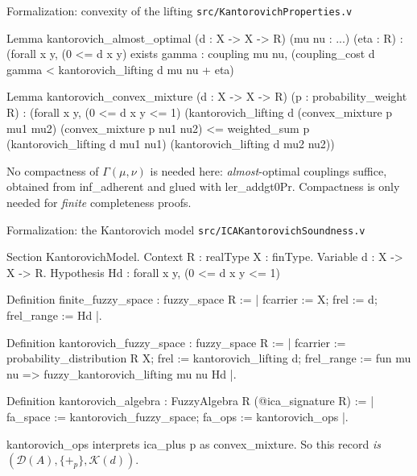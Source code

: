 \documentclass[10pt,aspectratio=169]{beamer}
\makeatletter
\newcommand{\ptag}[1]{\hfill\textit{#1}}
\newcommand{\modelscript}{%
\pline{0}{Theorem kantorovich\_models\_ica :}
\pline{0}{\ \ fuzzy\_models kantorovich\_algebra (@ica\_theory R).}
\pline{1}{Proof.}
\pline{1}{\ \ rewrite /fuzzy\_models.}
\pline{1}{\ \ move => Y phi Hphi.}
\pline{1}{\ \ case: Hphi => [p | p | p q | p eps delta ...] rho.}
\pline{2}{\ \ - by rewrite kantorovich\_eval\_op}
\pline{2}{\ \ \ \ \ \ convex\_mixture\_idem.\ptag{Idem}}
\pline{2}{\ \ - by rewrite !kantorovich\_eval\_op}
\pline{2}{\ \ \ \ \ \ convex\_mixture\_skew\_comm.\ptag{SkewComm}}
\pline{2}{\ \ - by rewrite !kantorovich\_eval\_op}
\pline{2}{\ \ \ \ \ \ convex\_mixture\_skew\_assoc.\ptag{SkewAssoc}}
\pline{3}{\ \ - rewrite !kantorovich\_eval\_op.\ptag{Interp}}
\pline{3}{\ \ \ \ apply: (le\_trans}
\pline{3}{\ \ \ \ \ \ (kantorovich\_convex\_mixture \_ \_ \_ \_ \_ Hd)).}
\pline{3}{\ \ \ \ apply: weighted\_sum\_le.}
\pline{4}{\ \ \ \ - apply: (le\_trans (interpretation\_nexp}
\pline{4}{\ \ \ \ \ \ \ \ rho (inord 0) (inord 2))).}
\pline{4}{\ \ \ \ \ \ by rewrite /= /ica\_interp\_rel !inordK.}
\pline{4}{\ \ \ \ - apply: (le\_trans (interpretation\_nexp}
\pline{4}{\ \ \ \ \ \ \ \ rho (inord 1) (inord 3))).}
\pline{4}{\ \ \ \ \ \ by rewrite /= /ica\_interp\_rel !inordK.}
\pline{4}{Qed.}
}
\newcommand{\Dist}{\mathcal{D}}
\newcommand{\Kan}{\mathcal{K}}
\newcommand{\Cpl}{\Gamma}
\newcommand{\bpl}[1]{+_{#1}}
\newcommand{\file}[1]{{\color{rocqcon}\texttt{#1}}}
\newcommand{\rid}[1]{{\ttfamily\small #1}}
\makeatother
\begin{document}
\begin{frame}[fragile]{Formalization: convexity of the lifting}
  \file{src/KantorovichProperties.v}
  \begin{srcbox}
Lemma kantorovich_almost_optimal (d : X -> X -> R) (mu nu : ...) (eta : R) :
  (forall x y, (0 <= d x y)%
  exists gamma : coupling mu nu,
    (coupling_cost d gamma < kantorovich_lifting d mu nu + eta)%

Lemma kantorovich_convex_mixture (d : X -> X -> R) (p : probability_weight R) :
  (forall x y, (0 <= d x y <= 1)%
  (kantorovich_lifting d (convex_mixture p mu1 mu2) (convex_mixture p nu1 nu2)
     <= weighted_sum p (kantorovich_lifting d mu1 nu1)
                       (kantorovich_lifting d mu2 nu2))%
  \end{srcbox}
  \vfill
  \begin{alertblock}{}
    No compactness of $\Cpl(\mu,\nu)$ is needed here:
    \emph{almost}-optimal couplings suffice, obtained from
    \rid{inf\_adherent} and glued with \rid{ler\_addgt0Pr}. Compactness
    is only needed for \emph{finite} completeness proofs.
  \end{alertblock}
\end{frame}

\begin{frame}[fragile]{Formalization: the Kantorovich model}
  \file{src/ICAKantorovichSoundness.v}
  \begin{srcbox}
Section KantorovichModel.
Context {R : realType} {X : finType}.
Variable d : X -> X -> R.
Hypothesis Hd : forall x y, (0 <= d x y <= 1)%

Definition finite_fuzzy_space : fuzzy_space R :=
  {| fcarrier := X; frel := d; frel_range := Hd |}.

Definition kantorovich_fuzzy_space : fuzzy_space R :=
  {| fcarrier := probability_distribution R X;
     frel := kantorovich_lifting d;
     frel_range := fun mu nu => fuzzy_kantorovich_lifting mu nu Hd |}.

Definition kantorovich_algebra : FuzzyAlgebra R (@ica_signature R) :=
  {| fa_space := kantorovich_fuzzy_space; fa_ops := kantorovich_ops |}.
  \end{srcbox}
  \vfill
  \rid{kantorovich\_ops} interprets \rid{ica\_plus p} as
  \rid{convex\_mixture}. So this record \emph{is}
  $(\Dist(A),\{\bpl{p}\},\Kan(d))$.
\end{frame}

\newcommand{\modpane}[1]{%
  \begin{scriptbox}[fontupper=\ttfamily\fontsize{5.8pt}{6.6pt}\selectfont\frenchspacing]%
  \pstep{#1}\modelscript\end{scriptbox}}
\end{document}
